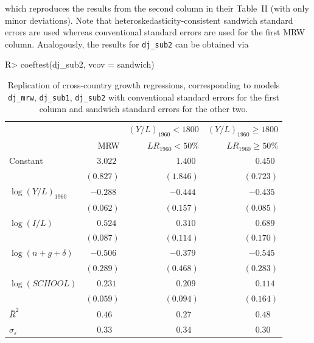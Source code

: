 \documentclass[10pt,a4paper,twoside]{article}
\let\code=\texttt
\let\pkg=\textbf
\let\proglang=\textsf
\newenvironment{Schunk}{}{}
\begin{document}
which reproduces the results from the second column in their Table~II (with only
minor deviations). Note that heteroskedasticity-consistent sandwich
standard errors are used
\citep[provided by package \pkg{sandwich} in \proglang{R}, see][]{repro:Zeileis:2004,repro:Zeileis:2006}
whereas conventional standard errors are used for the first MRW column. Analogously, the
results for \code{dj\_sub2} can be obtained via

\begin{Schunk}
\begin{Sinput}
R> coeftest(dj_sub2, vcov = sandwich)
\end{Sinput}
\end{Schunk}



\begin{table}[t]
\caption{\label{tab:dj} Replication of cross-country growth regressions, corresponding to
models \code{dj\_mrw}, \code{dj\_sub1}, \code{dj\_sub2} with conventional standard errors
for the first column and sandwich standard errors for the other two.}
\begin{center}
\begin{tabular}{lrrr} \hline
& & $(Y/L)_{1960} < 1800$ & $(Y/L)_{1960} \ge 1800$ \\
& MRW & $\mathit{LR}_{1960} < 50\%$ & $\mathit{LR}_{1960} \ge 50\%$ \\ \hline
Constant & $3.022\phantom{)}$ & $1.400\phantom{)}$ & $0.450\phantom{)}$ \\
 & $(0.827)$ & $(1.846)$ & $(0.723)$ \\
$\log(Y/L)_{1960}$ & $-0.288\phantom{)}$ & $-0.444\phantom{)}$ & $-0.435\phantom{)}$ \\
 & $(0.062)$ & $(0.157)$ & $(0.085)$ \\
$\log(I/L)$ & $0.524\phantom{)}$ & $0.310\phantom{)}$ & $0.689\phantom{)}$ \\
 & $(0.087)$ & $(0.114)$ & $(0.170)$ \\
$\log(n + g + \delta)$ & $-0.506\phantom{)}$ & $-0.379\phantom{)}$ & $-0.545\phantom{)}$ \\
 & $(0.289)$ & $(0.468)$ & $(0.283)$ \\
$\log(\mathit{SCHOOL})$ & $0.231\phantom{)}$ & $0.209\phantom{)}$ & $0.114\phantom{)}$ \\
 & $(0.059)$ & $(0.094)$ & $(0.164)$ \\ \hline
$\bar R^2$ & $0.46\phantom{0)}$ & $0.27\phantom{0)}$ & $0.48\phantom{0)}$ \\
$\sigma_\varepsilon$ & $0.33\phantom{0)}$ & $0.34\phantom{0)}$ & $0.30\phantom{0)}$ \\ \hline\end{tabular}
\end{center}
\end{table}
\end{document}
